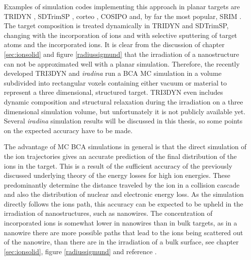 Examples of simulation codes implementing this approach in planar targets are TRIDYN \cite{moller_tridyn_1984}, SDTrimSP \cite{bizyukov_morphology_2008}, corteo \cite{schiettekatte_fast_2008}, COSIPO \cite{hautala_nuclear_1984} and, by far the most popular, SRIM \cite{ziegler_srim_2012}. The target composition is treated dynamically in TRIDYN and SDTrimSP, changing with the incorporation of ions and with selective sputtering of target atoms and the incorporated ions. It is clear from the discussion of chapter \ref{sec:ionsolid} and figure \ref{radiussigmund} that the irradiation of a nanostructure can not be approximated well with a planar simulation. Therefore, the recently developed TRI3DYN \cite{moller_tri3dyn_2014} and \emph{iradina} \cite{borschel_ion_2011} run a BCA MC simulation in a volume subdivided into rectangular voxels containing either vacuum or material to represent a three dimensional, structured target. TRI3DYN even includes dynamic composition and structural relaxation during the irradiation on a three dimensional simulation volume, but unfortunately it is not publicly available yet. Several \emph{iradina} simulation results will be discussed in this thesis, so some points on the expected accuracy have to be made. 

The advantage of MC BCA simulations in general is that the direct simulation of the ion trajectories gives an accurate prediction of the final distribution of the ions in the target. This is a result of the sufficient accuracy of the previously discussed underlying theory of the energy losses for high ion energies. These predominantly determine the distance traveled by the ion in a collision cascade and also the distribution of nuclear and electronic energy loss. As the simulation directly follows the ions path, this accuracy can be expected to be upheld in the irradiation of nanostructures, such as nanowires. The concentration of incorporated ions is somewhat lower in nanowires than in bulk targets, as in a nanowire there are more possible paths that lead to the ions being scattered out of the nanowire, than there are in the irradiation of a bulk surface, see chapter \ref{sec:ionsolid}, figure \ref{radiussigmund} and reference \cite{borschel_ion-solid_2012}. 

